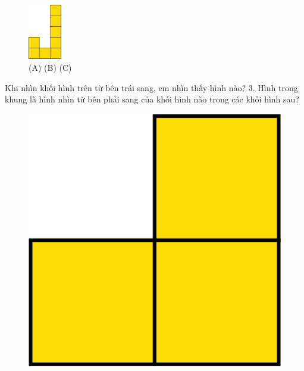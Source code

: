 \begin{multicols}{2}
\begin{figure}[H]
		\includegraphics[width=0.13\textwidth]{7c}
		\caption{{\color[named]{toancuabi}\hspace*{5pt}(A)\hspace*{50pt} (B) \hspace*{35pt}(C)}}
		\vspace*{-5pt}
	\end{figure} 
	\end{multicols}
	Khi nhìn khối hình trên từ {\color[named]{toancuabi}bên trái} sang, em nhìn thấy hình nào?
	\vskip 0.1cm
	$3.$ Hình trong khung là hình nhìn từ {\color[named]{toancuabi}bên phải} sang của khối hình nào trong các khối hình sau?
	\vskip 0.1cm
	\begin{adjustwidth}{0pt}{200pt}
		\begin{thBox}
			\begin{figure}[H]
				\centering
				\vspace*{5pt}
				\captionsetup{labelformat= empty, justification=centering}
				\includegraphics[scale=0.3]{8}
				\vspace*{20pt}
			\end{figure}
		\end{thBox}
	\end{adjustwidth}
	
